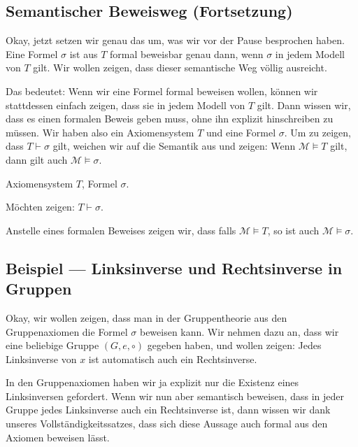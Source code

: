 \subsection{Semantischer Beweisweg (Fortsetzung)}
\begin{spoken-clean}[00:47:10 - 00:50:05]
Okay, jetzt setzen wir genau das um, was wir vor der Pause besprochen haben. Eine Formel $\sigma$ ist aus $T$ formal beweisbar genau dann, wenn $\sigma$ in jedem Modell von $T$ gilt. Wir wollen zeigen, dass dieser semantische Weg völlig ausreicht.

Das bedeutet: Wenn wir eine Formel formal beweisen wollen, können wir stattdessen einfach zeigen, dass sie in jedem Modell von $T$ gilt. Dann wissen wir, dass es einen formalen Beweis geben muss, ohne ihn explizit hinschreiben zu müssen. Wir haben also ein Axiomensystem $T$ und eine Formel $\sigma$. Um zu zeigen, dass $T \vdash \sigma$ gilt, weichen wir auf die Semantik aus und zeigen: Wenn $\mathcal{M} \models T$ gilt, dann gilt auch $\mathcal{M} \models \sigma$.
\end{spoken-clean}

\begin{math-stroke}
Axiomensystem $T$, Formel $\sigma$.

Möchten zeigen: $T \vdash \sigma$.

Anstelle eines formalen Beweises zeigen wir, dass falls $\mathcal{M} \models T$, so ist auch $\mathcal{M} \models \sigma$.
\end{math-stroke}

\subsection{Beispiel --- Linksinverse und Rechtsinverse in Gruppen}
\begin{spoken-clean}[00:50:05 - 00:53:36]
Okay, wir wollen zeigen, dass man in der Gruppentheorie aus den Gruppenaxiomen die Formel $\sigma$ beweisen kann. Wir nehmen dazu an, dass wir eine beliebige Gruppe $(G, e, \circ)$ gegeben haben, und wollen zeigen: Jedes Linksinverse von $x$ ist automatisch auch ein Rechtsinverse.

In den Gruppenaxiomen haben wir ja explizit nur die Existenz eines Linksinversen gefordert. Wenn wir nun aber semantisch beweisen, dass in jeder Gruppe jedes Linksinverse auch ein Rechtsinverse ist, dann wissen wir dank unseres Vollständigkeitssatzes, dass sich diese Aussage auch formal aus den Axiomen beweisen lässt.
\end{spoken-clean}

